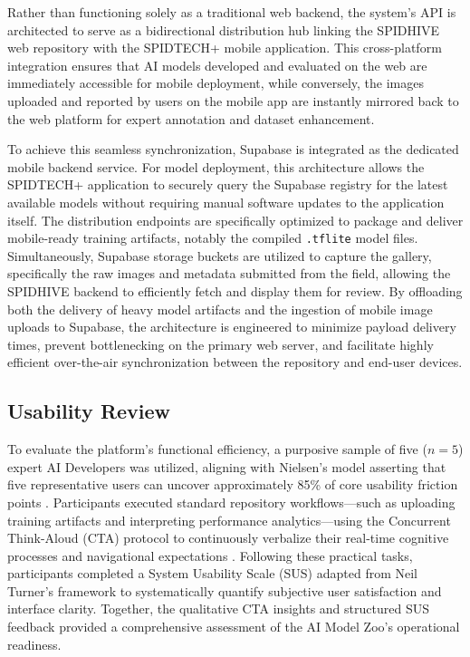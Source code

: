\documentclass{icsthesis}
\begin{document}
\begin{mainmatter}
            Rather than functioning solely as a traditional web backend, the system's API is architected to serve as a bidirectional distribution hub linking the SPIDHIVE web repository with the SPIDTECH+ mobile application. This cross-platform integration ensures that AI models developed and evaluated on the web are immediately accessible for mobile deployment, while conversely, the images uploaded and reported by users on the mobile app are instantly mirrored back to the web platform for expert annotation and dataset enhancement.
            
            To achieve this seamless synchronization, Supabase is integrated as the dedicated mobile backend service. For model deployment, this architecture allows the SPIDTECH+ application to securely query the Supabase registry for the latest available models without requiring manual software updates to the application itself. The distribution endpoints are specifically optimized to package and deliver mobile-ready training artifacts, notably the compiled \texttt{.tflite} model files. Simultaneously, Supabase storage buckets are utilized to capture the gallery, specifically the raw images and metadata submitted from the field, allowing the SPIDHIVE backend to efficiently fetch and display them for review. By offloading both the delivery of heavy model artifacts and the ingestion of mobile image uploads to Supabase, the architecture is engineered to minimize payload delivery times, prevent bottlenecking on the primary web server, and facilitate highly efficient over-the-air synchronization between the repository and end-user devices.
            
            \subsection{Usability Review}
            To evaluate the platform's functional efficiency, a purposive sample of five ($n=5$) expert AI Developers was utilized, aligning with Nielsen's model asserting that five representative users can uncover approximately 85\% of core usability friction points \cite{Nielsen_2024}. Participants executed standard repository workflows—such as uploading training artifacts and interpreting performance analytics—using the Concurrent Think-Aloud (CTA) protocol to continuously verbalize their real-time cognitive processes and navigational expectations \cite{Moran_2026}. Following these practical tasks, participants completed a System Usability Scale (SUS) adapted from Neil Turner’s framework \cite{Sauro} to systematically quantify subjective user satisfaction and interface clarity. Together, the qualitative CTA insights and structured SUS feedback provided a comprehensive assessment of the AI Model Zoo's operational readiness.


\end{mainmatter}
\end{document}
